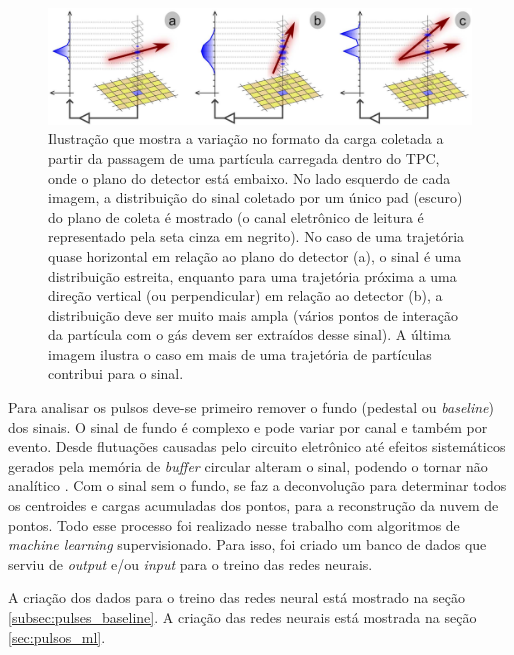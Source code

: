 \documentclass[a4paper,12pt,oneside]{book}
\begin{document}
\begin{figure}[H]
    \centering
    \includegraphics[scale = 0.325]{figs/get.png}
    \caption{Ilustração que mostra a variação no formato da carga coletada a partir da passagem de uma partícula carregada dentro do TPC, onde o plano do detector está embaixo. No lado esquerdo de cada imagem, a distribuição do sinal coletado por um único pad (escuro) do plano de coleta é mostrado (o canal eletrônico de leitura é representado pela seta cinza em negrito). No caso de uma trajetória quase horizontal em relação ao plano do detector (a), o sinal é uma distribuição estreita, enquanto para uma trajetória próxima a uma direção vertical (ou perpendicular) em relação ao detector (b), a distribuição deve ser muito mais ampla (vários pontos de interação da partícula com o gás devem ser extraídos desse sinal). A última imagem ilustra o caso em mais de uma trajetória de partículas contribui para o sinal\cite{GET}.}
    \label{fig:get_signal}
\end{figure}

\par Para analisar os pulsos deve-se primeiro remover o fundo (pedestal ou \textit{baseline}) dos sinais. O sinal de fundo é complexo e pode variar por canal e também por evento. Desde flutuações causadas pelo circuito eletrônico até efeitos sistemáticos gerados pela memória de \textit{buffer} circular alteram o sinal, podendo o tornar não analítico \cite{FORTINO2022166497, GET}. Com o sinal sem o fundo, se faz a deconvolução para determinar todos os centroides e cargas acumuladas dos pontos, para a reconstrução da nuvem de pontos. Todo esse processo foi realizado nesse trabalho com algoritmos de \textit{machine learning} supervisionado\cite{FORTINO2022166497}. Para isso, foi criado um banco de dados que serviu de \textit{output} e/ou \textit{input} para o treino das redes neurais.

\par A criação dos dados para o treino das redes neural está mostrado na seção \ref{subsec:pulses_baseline}. A criação das redes neurais está mostrada na seção \ref{sec:pulsos_ml}. 
\end{document}
